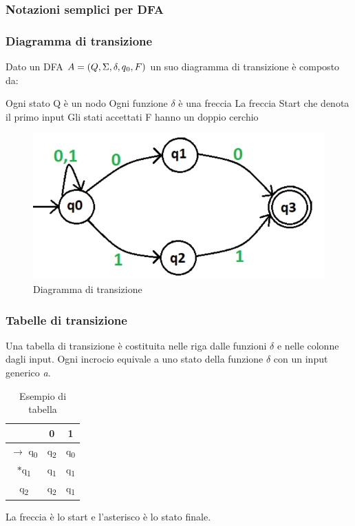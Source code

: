 \documentclass[12pt]{article}
\begin{document}
\subsubsection{ Notazioni semplici per DFA }
\subsubsection*{ Diagramma di transizione }
Dato un DFA $A = (Q, \Sigma, \delta, q\textsubscript{0}, F)$ un suo diagramma di transizione è composto da: 
\begin{outline}
  \1 Ogni stato Q è un nodo 
  \1 Ogni funzione $\delta$ è una freccia
  \1 La freccia Start che denota il primo input 
  \1 Gli stati accettati F hanno un doppio cerchio
\end{outline}
\begin{figure}[h]
\includegraphics[scale = 0.3]{media/diagramma_stato.png}
\centering
\caption{Diagramma di transizione}
\end{figure}

\subsubsection*{ Tabelle di transizione }
Una tabella di transizione è costituita nelle riga dalle funzioni $\delta$ e nelle colonne dagli input. Ogni incrocio equivale a uno stato della funzione $\delta$ con un input generico \emph{a}.

\begin{table}[h]
\centering
\begin{tabular}{c | c | c}
& 0 & 1 \\
\hline
$\rightarrow$  q\textsubscript{0} & q\textsubscript{2} & q\textsubscript{0} \\
$*$q\textsubscript{1} & q\textsubscript{1} & q\textsubscript{1} \\
q\textsubscript{2} & q\textsubscript{2} & q\textsubscript{1} \\
\end{tabular}
\caption{Esempio di tabella}
\end{table}
La freccia è lo start e l'asterisco è lo stato finale.
\end{document}
